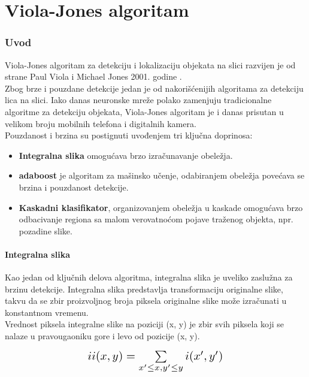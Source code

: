 \part{Viola-Jones algoritam}\label{viola_jones_algorithm}
\section{Uvod} \label{viola_jones_introduction}

Viola-Jones algoritam za detekciju i lokalizaciju objekata na slici razvijen je od
strane Paul Viola i Michael Jones 2001. godine \cite{Viola2001RapidOD}.\\
Zbog brze i pouzdane detekcije jedan je od nakorišćenijih algoritama za
detekciju lica na slici.
Iako danas neuronske mreže polako zamenjuju tradicionalne algoritme za detekciju
objekata, Viola-Jones algoritam je i danas prisutan u velikom broju mobilnih
telefona i digitalnih kamera. \\

Pouzdanost i brzina su postignuti uvođenjem tri ključna doprinosa:
\begin{itemize}
\item \textbf{Integralna slika} omogućava brzo izračunavanje obeležja.
\item \textbf{\gls{adaboost}} je algoritam za mašinsko učenje, odabiranjem
  obeležja povećava se brzina i pouzdanost detekcije.
\item \textbf{Kaskadni klasifikator}, organizovanjem obeležja u kaskade
  omogućava brzo odbacivanje regiona sa malom verovatnoćom pojave traženog
  objekta, npr. pozadine slike. \\
\end{itemize}


\subsection{Integralna slika} \label{ii_sec}

Kao jedan od ključnih delova algoritma, integralna slika je uveliko zaslužna za
brzinu detekcije.
Integralna slika predstavlja transformaciju originalne slike, takvu da se zbir
proizvoljnog broja piksela originalne slike može izračunati u konstantnom
vremenu.\\

Vrednost piksela integralne slike na poziciji (x, y) je zbir svih piksela koji
se nalaze u pravougaoniku gore i levo od pozicije (x, y).

\begin{equation}
  \Scale[1.4]{ii(x,y)=\sum\limits_{x'\leq x, y'\leq y} i(x',y')}
  \label{IntegralImage_eq1}
\end{equation}

